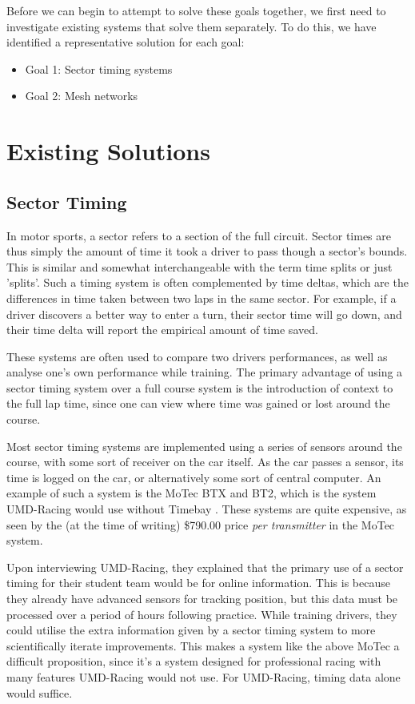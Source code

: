 \documentclass[journal]{IEEEtran}
\begin{document}
Before we can begin to attempt to solve these goals together, we first need to investigate existing systems that solve them separately. To do this, we have identified a representative solution for each goal:

\begin{itemize}
    \item Goal 1: Sector timing systems
    \item Goal 2: Mesh networks
\end{itemize}

\section{Existing Solutions}

\subsection{Sector Timing}

In motor sports, a sector refers to a section of the full circuit. Sector times are thus simply the amount of time it took a driver to pass though a sector's bounds. This is similar and somewhat interchangeable with the term time splits or just 'splits'. Such a timing system is often complemented by time deltas, which are the differences in time taken between two laps in the same sector. For example, if a driver discovers a better way to enter a turn, their sector time will go down, and their time delta will report the empirical amount of time saved.

These systems are often used to compare two drivers performances, as well as analyse one's own performance while training. The primary advantage of using a sector timing system over a full course system is the introduction of context to the full lap time, since one can view where time was gained or lost around the course.

Most sector timing systems are implemented using a series of sensors around the course, with some sort of receiver on the car itself. As the car passes a sensor, its time is logged on the car, or alternatively some sort of central computer. An example of such a system is the MoTec BTX and BT2, which is the system UMD-Racing would use without Timebay \cite{motec}. These systems are quite expensive, as seen by the (at the time of writing) \$790.00 price \textit{per transmitter} in the MoTec system.

Upon interviewing UMD-Racing, they explained that the primary use of a sector timing for their student team would be for online information. This is because they already have advanced sensors for tracking position, but this data must be processed over a period of hours following practice. While training drivers, they could utilise the extra information given by a sector timing system to more scientifically iterate improvements. This makes a system like the above MoTec a difficult proposition, since it's a system designed for professional racing with many features UMD-Racing would not use. For UMD-Racing, timing data alone would suffice. 
\end{document}
